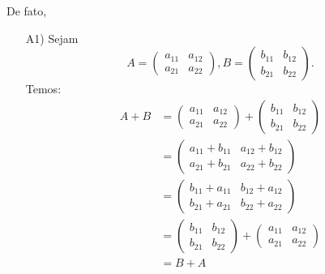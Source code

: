 \documentclass[12pt]{exam}
\begin{document}
    De fato,
    \begin{itemize}
        \item[A1)] Sejam
        \[
        A = \begin{pmatrix} a_{11} & a_{12}\\a_{21} & a_{22}\end{pmatrix},
        B = \begin{pmatrix} b_{11} & b_{12}\\b_{21} & b_{22}\end{pmatrix}.
        \]
        Temos:
        \begin{align*}
            A + B & = \begin{pmatrix} a_{11} & a_{12}\\a_{21} & a_{22}\end{pmatrix} + \begin{pmatrix} b_{11} & b_{12}\\b_{21} & b_{22}\end{pmatrix}
            \\ &= \begin{pmatrix} a_{11} + b_{11} & a_{12} + b_{12}\\a_{21} + b_{21} & a_{22} + b_{22}\end{pmatrix}
            \\ &= \begin{pmatrix} b_{11} + a_{11} & b_{12} + a_{12}\\b_{21} + a_{21} & b_{22} + a_{22}\end{pmatrix}
            \\ &= \begin{pmatrix} b_{11} & b_{12}\\b_{21} & b_{22}\end{pmatrix} + \begin{pmatrix} a_{11} & a_{12}\\a_{21} & a_{22}\end{pmatrix}
            \\ &= B + A
        \end{align*}


\end{itemize}
\end{document}
